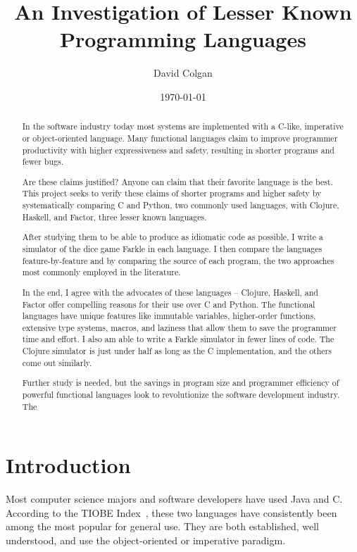 \documentclass{article}
\title{An Investigation of Lesser Known Programming Languages}
\author{David Colgan}
\date{\today}
\begin{document}
\maketitle

\tableofcontents

\begin{abstract}

In the software industry today most systems are implemented with a C-like,
imperative or object-oriented language.  Many functional languages claim to
improve programmer productivity with higher expressiveness and safety,
resulting in shorter programs and fewer bugs.

Are these claims justified?  Anyone can claim that their favorite language is
the best.  This project seeks to verify these claims of shorter programs and
higher safety by systematically comparing C and Python, two commonly used
languages, with Clojure, Haskell, and Factor, three lesser known languages.

After studying them to be able to produce as idiomatic code as possible, I
write a simulator of the dice game Farkle in each language.  I then compare the
languages feature-by-feature and by comparing the source of each program, the
two approaches most commonly employed in the literature.

In the end, I agree with the advocates of these languages -- Clojure, Haskell,
and Factor offer compelling reasons for their use over C and Python.  The
functional languages have unique features like immutable variables,
higher-order functions, extensive type systems, macros, and laziness that allow
them to save the programmer time and effort.  I also am able to write a Farkle
simulator in fewer lines of code.  The Clojure simulator is just under half as
long as the C implementation, and the others come out similarly.

Further study is needed, but the savings in program size and programmer
efficiency of powerful functional languages look to revolutionize the software
development industry.  The 

\end{abstract}

\section{Introduction}

Most computer science majors and software developers have used Java and C.
According to the TIOBE Index~\cite{tiobe}, these two languages have
consistently been among the most popular for general use.  They are both
established, well understood, and use the object-oriented or imperative
paradigm.
\end{document}
